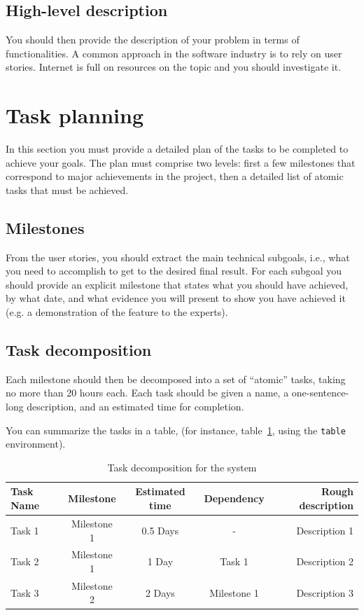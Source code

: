 \documentclass{article}
\begin{document}
\subsection{High-level description} 
You should then provide the description of your problem in terms of functionalities. A common approach in the software industry is to rely on user stories. Internet is full on resources on the topic and you should investigate it.


\section{Task planning}
In this section you must provide a detailed plan of the tasks to be completed to achieve your goals. The plan must comprise two levels: first a few milestones that correspond to major achievements in the project, then a detailed list of atomic tasks that must be achieved.

\subsection{Milestones} 
From the user stories, you should extract the main technical subgoals, i.e., what you need to accomplish to get to the desired final result. For each subgoal you should provide an explicit milestone that states what you should have achieved, by what date, and what evidence you will present to show you have achieved it (e.g. a demonstration of the feature to the experts).


\subsection{Task decomposition} 
Each milestone should then be decomposed into a set of ``atomic'' tasks, taking no more than 20 hours each. Each task should be given a name, a one-sentence-long description, and an estimated time for completion.


You can summarize the tasks in a table, (for instance, table~\ref{tab:sample-table}, using the \verb+table+ environment).

\begin{table}[h]
\vskip 3mm
\begin{center}
\begin{small}
\begin{sc}
\begin{tabular}{lcccr}
\hline
\abovespace\belowspace
Task Name & Milestone  & Estimated time & Dependency &  Rough description \\
\hline
\abovespace
Task 1 & Milestone 1    & 0.5 Days & - & Description 1 \\
Task 2 & Milestone 1    & 1 Day  & Task 1 & Description 2 \\
Task 3 & Milestone 2    & 2 Days & Milestone 1 & Description 3 
\belowspace
\end{tabular}
\end{sc}
\end{small}
\caption{Task decomposition for the system}
\label{tab:sample-table}
\end{center}
\vskip -3mm
\end{table}
\end{document}
